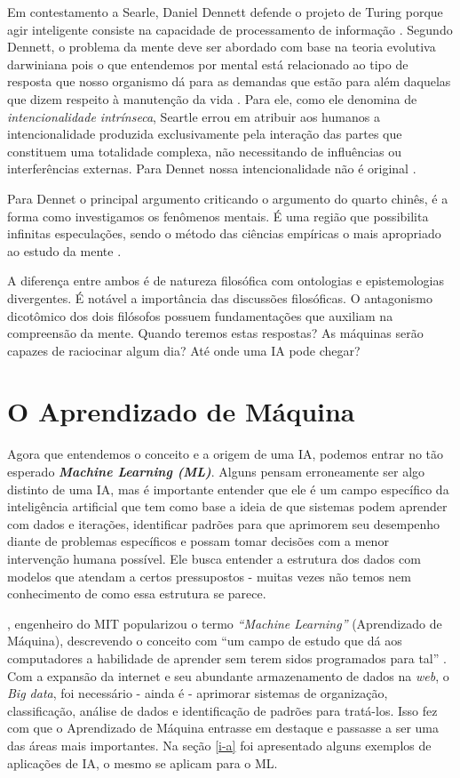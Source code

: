 \documentclass[
  openany]{book}
\begin{document}
Em contestamento a Searle, Daniel Dennett defende o projeto de Turing porque agir inteligente consiste na capacidade de processamento de informação \citep{dennett2009part}. Segundo Dennett, o problema da mente deve ser abordado com base na teoria evolutiva darwiniana pois o que entendemos por mental está relacionado ao tipo de resposta que nosso organismo dá para as demandas que estão para além daquelas que dizem respeito à manutenção da vida \citep{da2013searle}. Para ele, como ele denomina de \emph{intencionalidade intrínseca}, Seartle errou em atribuir aos humanos a intencionalidade produzida exclusivamente pela interação das partes que constituem uma totalidade complexa, não necessitando de influências ou interferências externas. Para Dennet nossa intencionalidade não é original \citep{dennett2009part}.

Para Dennet o principal argumento criticando o argumento do quarto chinês, é a forma como investigamos os fenômenos mentais. É uma região que possibilita infinitas especulações, sendo o método das ciências empíricas o mais apropriado ao estudo da mente \citep{da2013searle}.

A diferença entre ambos é de natureza filosófica com ontologias e epistemologias divergentes. É notável a importância das discussões filosóficas. O antagonismo dicotômico dos dois filósofos possuem fundamentações que auxiliam na compreensão da mente. Quando teremos estas respostas? As máquinas serão capazes de raciocinar algum dia? Até onde uma IA pode chegar?

\hypertarget{machinelearning}{%
\chapter{O Aprendizado de Máquina}\label{machinelearning}}

Agora que entendemos o conceito e a origem de uma IA, podemos entrar no tão esperado \textbf{\emph{Machine Learning (ML)}}. Alguns pensam erroneamente ser algo distinto de uma IA, mas é importante entender que ele é um campo específico da inteligência artificial que tem como base a ideia de que sistemas podem aprender com dados e iterações, identificar padrões para que aprimorem seu desempenho diante de problemas específicos e possam tomar decisões com a menor intervenção humana possível. Ele busca entender a estrutura dos dados com modelos que atendam a certos pressupostos - muitas vezes não temos nem conhecimento de como essa estrutura se parece.

\citet{samuel1959some}, engenheiro do MIT popularizou o termo \emph{``Machine Learning''} (Aprendizado de Máquina), descrevendo o conceito com ``um campo de estudo que dá aos computadores a habilidade de aprender sem terem sidos programados para tal'' \citep{simon2013too}. Com a expansão da internet e seu abundante armazenamento de dados na \emph{web}, o \emph{Big data}, foi necessário - ainda é - aprimorar sistemas de organização, classificação, análise de dados e identificação de padrões para tratá-los. Isso fez com que o Aprendizado de Máquina entrasse em destaque e passasse a ser uma das áreas mais importantes. Na seção \ref{i-a} foi apresentado alguns exemplos de aplicações de IA, o mesmo se aplicam para o ML.
\end{document}
